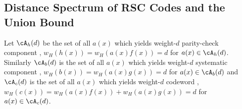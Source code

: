 \subsection{ Distance Spectrum of RSC Codes and the Union Bound}
\label{sec4}


 Let $\cA_h(d)$ be the set of all $a(x)$ which yields weight-$d$ parity-check component \ie, $w_H(h(x))=w_H(a(x)f(x))=d$ for $a(x) \in \cA_h(d)$. 
Similarly $\cA_b(d)$ is the set of all $a(x)$ which yields weight-$d$ systematic component \ie, $w_H(b(x))=w_H(a(x)g(x))=d$ for $a(x) \in \cA_b(d)$
 and $\cA_c(d)$ is the set of all $a(x)$ which yields weight-$d$ codeword \ie, $w_H(c(x))=w_H(a(x)f(x))+ w_H(a(x)g(x))=d$ for $a(x) \in \cA_c(d)$.  

